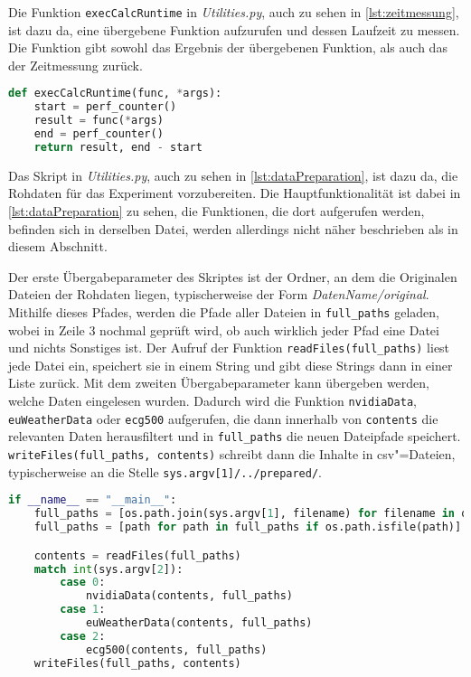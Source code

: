 Die Funktion \lstinline|execCalcRuntime| in \textit{Utilities.py}, auch zu sehen in \autoref{lst:zeitmessung}, ist dazu da, eine übergebene Funktion aufzurufen und dessen Laufzeit zu messen. Die Funktion gibt sowohl das Ergebnis der übergebenen Funktion, als auch das der Zeitmessung zurück.
\begin{lstlisting}[caption=Funktion zur Zeitmessung, language=Python, label=lst:zeitmessung, style=Python]
def execCalcRuntime(func, *args):
    start = perf_counter()
    result = func(*args)
    end = perf_counter()
    return result, end - start
\end{lstlisting}

Das Skript in \textit{Utilities.py}, auch zu sehen in \autoref{lst:dataPreparation}, ist dazu da, die Rohdaten für das Experiment vorzubereiten. Die Hauptfunktionalität ist dabei in \autoref{lst:dataPreparation} zu sehen, die Funktionen, die dort aufgerufen werden, befinden sich in derselben Datei, werden allerdings nicht näher beschrieben als in diesem Abschnitt.

Der erste Übergabeparameter des Skriptes ist der Ordner, an dem die Originalen Dateien der Rohdaten liegen, typischerweise der Form \textit{DatenName/original}. Mithilfe dieses Pfades, werden die Pfade aller Dateien in \lstinline|full_paths| geladen, wobei in Zeile 3 nochmal geprüft wird, ob auch wirklich jeder Pfad eine Datei und nichts Sonstiges ist. Der Aufruf der Funktion \lstinline|readFiles(full_paths)| liest jede Datei ein, speichert sie in einem String und gibt diese Strings dann in einer Liste zurück. Mit dem zweiten Übergabeparameter kann übergeben werden, welche Daten eingelesen wurden. Dadurch wird die Funktion \lstinline|nvidiaData|, \lstinline|euWeatherData| oder \lstinline|ecg500| aufgerufen, die dann innerhalb von \lstinline|contents| die relevanten Daten herausfiltert und in \lstinline|full_paths| die neuen Dateipfade speichert. \lstinline|writeFiles(full_paths, contents)| schreibt dann die Inhalte in csv"=Dateien, typischerweise an die Stelle \lstinline|sys.argv[1]/../prepared/|.
\begin{lstlisting}[caption=Funktion zur Zeitmessung, language=Python, label=lst:dataPreparation, style=Python]
if __name__ == "__main__":
    full_paths = [os.path.join(sys.argv[1], filename) for filename in os.listdir(sys.argv[1])]
    full_paths = [path for path in full_paths if os.path.isfile(path)]

    contents = readFiles(full_paths)
    match int(sys.argv[2]):
        case 0:
            nvidiaData(contents, full_paths)
        case 1:
            euWeatherData(contents, full_paths)
        case 2:
            ecg500(contents, full_paths)
    writeFiles(full_paths, contents)
\end{lstlisting}